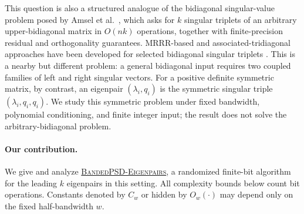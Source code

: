 \documentclass[11pt]{article}
\newcommand{\BandedPSDEigenpairs}{%
  \textnormal{\textsc{BandedPSD-\hspace{0pt}Eigenpairs}}}
\begin{document}
This question is also a structured analogue of the bidiagonal singular-value
problem posed by Amsel et al.~\cite[Problem~3.8]{amselEtAl2026OpenQuestions},
which asks for $k$ singular triplets of an
arbitrary upper-bidiagonal matrix in $O(nk)$ operations, together with
finite-precision residual and orthogonality guarantees.  MRRR-based and
associated-tridiagonal approaches have been developed for selected
bidiagonal singular triplets
\cite{willemsLangVomel2006BidiagonalSVD,willemsLang2012MR3GK,marquesDemmelVasconcelos2020BidiagonalSVD}.
This is a nearby but different problem: a general bidiagonal input requires
two coupled families of left and right singular vectors.  For a positive
definite symmetric matrix, by contrast, an eigenpair $(\lambda_i,q_i)$
is the symmetric singular triple $(\lambda_i,q_i,q_i)$.  We study this
symmetric problem under fixed bandwidth, polynomial conditioning, and
finite integer input; the result does not solve the arbitrary-bidiagonal
problem.

\paragraph{Our contribution.}
We give and analyze
\hyperref[alg:main]{\BandedPSDEigenpairs}, a randomized finite-bit
algorithm for the leading $k$ eigenpairs in this setting.  All complexity
bounds below count bit operations.  Constants denoted by $C_w$ or hidden by
$O_w(\cdot)$ may depend only on the fixed half-bandwidth $w$.
\end{document}
